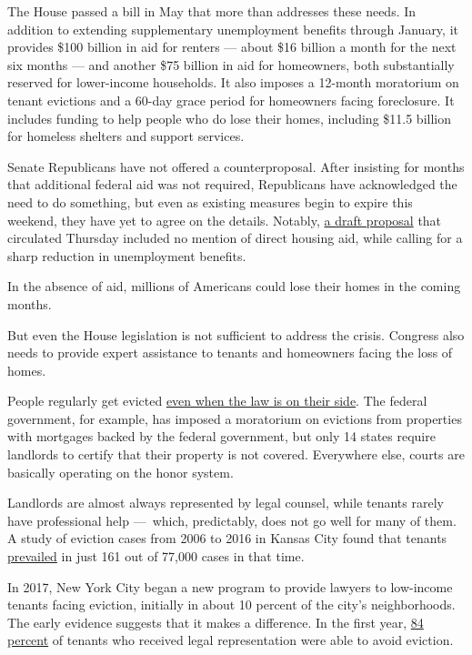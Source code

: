 The House passed a bill in May that more than addresses these needs. In
addition to extending supplementary unemployment benefits through
January, it provides \$100 billion in aid for renters --- about \$16
billion a month for the next six months --- and another \$75 billion in
aid for homeowners, both substantially reserved for lower-income
households. It also imposes a 12-month moratorium on tenant evictions
and a 60-day grace period for homeowners facing foreclosure. It includes
funding to help people who do lose their homes, including \$11.5 billion
for homeless shelters and support services.

Senate Republicans have not offered a counterproposal. After insisting
for months that additional federal aid was not required, Republicans
have acknowledged the need to do something, but even as existing
measures begin to expire this weekend, they have yet to agree on the
details. Notably,
\href{https://www.nytimes3xbfgragh.onion/interactive/2020/07/23/us/republican-draft-virus-aid-bill-july-23.html}{a
draft proposal} that circulated Thursday included no mention of direct
housing aid, while calling for a sharp reduction in unemployment
benefits.

In the absence of aid, millions of Americans could lose their homes in
the coming months.

But even the House legislation is not sufficient to address the crisis.
Congress also needs to provide expert assistance to tenants and
homeowners facing the loss of homes.

People regularly get evicted
\href{https://www.nytimes3xbfgragh.onion/2020/07/23/business/evictions-moratorium-cares-act.html}{even
when the law is on their side}. The federal government, for example, has
imposed a moratorium on evictions from properties with mortgages backed
by the federal government, but only 14 states require landlords to
certify that their property is not covered. Everywhere else, courts are
basically operating on the honor system.

Landlords are almost always represented by legal counsel, while tenants
rarely have professional help ---~which, predictably, does not go well
for many of them. A study of eviction cases from 2006 to 2016 in Kansas
City found that tenants
\href{https://static1.squarespace.com/static/59ba0bd359cc68f015b7ff8a/t/5a68e811e4966bee3fb5d6cd/1516824594549/KC+Eviction+Project+-+Courts+Analysis.pdf}{prevailed}
in just 161 out of 77,000 cases in that time.

In 2017, New York City began a new program to provide lawyers to
low-income tenants facing eviction, initially in about 10 percent of the
city's neighborhoods. The early evidence suggests that it makes a
difference. In the first year,
\href{https://www.cssny.org/news/entry/nyc-right-to-counsel}{84 percent}
of tenants who received legal representation were able to avoid
eviction.

